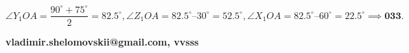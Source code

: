 \begin{enumerate}
 \[\angle Y_1 OA = \frac{90^\circ + 75^\circ}{2} = 82.5^\circ, \angle Z_1 OA = 82.5^\circ – 30^\circ = 52.5^\circ, \angle X_1 OA = 82.5^\circ – 60^\circ = 22.5^\circ \implies \boxed{\textbf{033}}.\]

 \textbf{vladimir.shelomovskii@gmail.com, vvsss}

 


 


 


\end{enumerate}